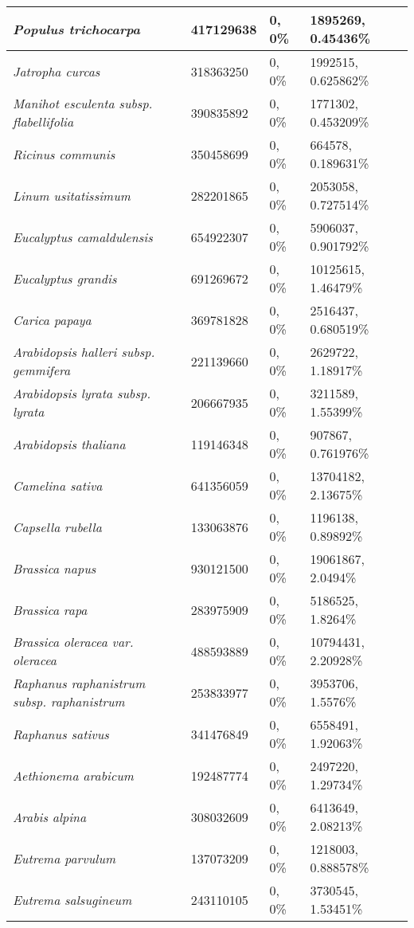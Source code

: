 {\begin{longtable}{| L{4cm} | L{2.7cm}  | L{3.7cm} | L{3.7cm} |}
\textit{Populus trichocarpa} & 417129638 & 0, 0\% & 1895269, 0.45436\% \\ \hline
\textit{Jatropha curcas} & 318363250 & 0, 0\% & 1992515, 0.625862\% \\ \hline
\textit{Manihot esculenta subsp. flabellifolia} & 390835892 & 0, 0\% & 1771302, 0.453209\% \\ \hline
\textit{Ricinus communis} & 350458699 & 0, 0\% & 664578, 0.189631\% \\ \hline
\textit{Linum usitatissimum} & 282201865 & 0, 0\% & 2053058, 0.727514\% \\ \hline
\textit{Eucalyptus camaldulensis} & 654922307 & 0, 0\% & 5906037, 0.901792\% \\ \hline
\textit{Eucalyptus grandis} & 691269672 & 0, 0\% & 10125615, 1.46479\% \\ \hline
\textit{Carica papaya} & 369781828 & 0, 0\% & 2516437, 0.680519\% \\ \hline
\textit{Arabidopsis halleri subsp. gemmifera} & 221139660 & 0, 0\% & 2629722, 1.18917\% \\ \hline
\textit{Arabidopsis lyrata subsp. lyrata} & 206667935 & 0, 0\% & 3211589, 1.55399\% \\ \hline
\textit{Arabidopsis thaliana} & 119146348 & 0, 0\% & 907867, 0.761976\% \\ \hline
\textit{Camelina sativa} & 641356059 & 0, 0\% & 13704182, 2.13675\% \\ \hline
\textit{Capsella rubella} & 133063876 & 0, 0\% & 1196138, 0.89892\% \\ \hline
\textit{Brassica napus} & 930121500 & 0, 0\% & 19061867, 2.0494\% \\ \hline
\textit{Brassica rapa} & 283975909 & 0, 0\% & 5186525, 1.8264\% \\ \hline
\textit{Brassica oleracea var. oleracea} & 488593889 & 0, 0\% & 10794431, 2.20928\% \\ \hline
\textit{Raphanus raphanistrum subsp. raphanistrum} & 253833977 & 0, 0\% & 3953706, 1.5576\% \\ \hline
\textit{Raphanus sativus} & 341476849 & 0, 0\% & 6558491, 1.92063\% \\ \hline
\textit{Aethionema arabicum} & 192487774 & 0, 0\% & 2497220, 1.29734\% \\ \hline
\textit{Arabis alpina} & 308032609 & 0, 0\% & 6413649, 2.08213\% \\ \hline
\textit{Eutrema parvulum} & 137073209 & 0, 0\% & 1218003, 0.888578\% \\ \hline
\textit{Eutrema salsugineum} & 243110105 & 0, 0\% & 3730545, 1.53451\% \\ \hline

\end{longtable}}

